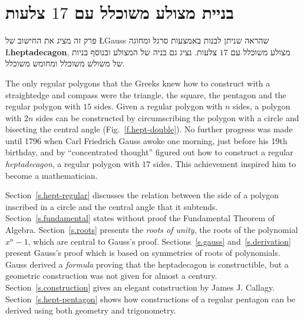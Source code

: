 

\chapter{בניית מצולע משוכלל עם 
$17$
צלעות}
\label{c.heptadecagon}


פרק זה מציג את החישוב של 
\L{Gauss}
שהראה שניתן לבנות  באמצעות סרגל ומחוגה
\L{\textbf{heptadecagon}},
מצולע משוכלל עם 
$17$
צלעות.
נציג גם בניה של המצולע ובנוסף בניות של משולש משוכלל ומחומש משוכלל.

The only regular polygons that the Greeks knew how to construct with a straightedge and compass were the triangle, the square, the pentagon and the regular polygon with $15$ sides. Given a regular polygon with $n$ sides, a polygon with $2n$ sides can be constructed by circumscribing the polygon with a circle and bisecting the central angle (Fig.~\ref{f.hept-double}). No further progress was made until 1796 when Carl Friedrich Gauss awoke one morning, just before his 19th birthday, and by ``concentrated thought'' figured out how to construct a regular \emph{heptadecagon}, a regular polygon with $17$ sides. This achievement inspired him to become a mathematician.

Section~\ref{s.hept-regular} discusses the relation between the side of a polygon inscribed in a circle and the central angle that it subtends. Section~\ref{s.fundamental} states without proof the Fundamental Theorem of Algebra. Section~\ref{s.roots} presents the \emph{roots of unity}, the roots of the polynomial $x^n-1$, which are central to Gauss's proof. Sections~\ref{s.gauss} and~\ref{s.derivation} present Gauss's proof which is based on symmetries of roots of polynomials. Gauss derived a \emph{formula} proving that the heptadecagon is constructible, but a geometric construction was not given for almost a century. Section~\ref{s.construction} gives an elegant construction by James J. Callagy. Section~\ref{s.hept-pentagon} shows how constructions of a regular pentagon can be derived using both geometry and trigonometry.

